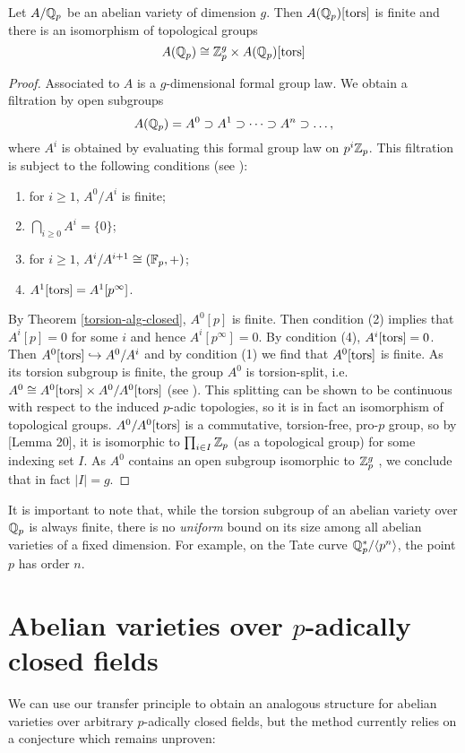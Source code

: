 \begin{theorem}
\label{structure-of-padic-AVs}
Let $A/\mathbb{Q}_p$ be an abelian variety of dimension $g$. Then $A(\mathbb{Q}_p)[\operatorname{tors}]$ is finite and there is an isomorphism of topological groups $$A(\mathbb{Q}_p)\cong \mathbb{Z}_p^g\times A(\mathbb{Q}_p)[\operatorname{tors}]$$
\end{theorem}
\begin{proof}
Associated to $A$ is a $g$-dimensional formal group law. We obtain a filtration by open subgroups $$A(\mathbb{Q}_p)=A^0\supset A^1\supset \dots\supset A^n\supset \dots, $$ where $A^i$ is obtained by evaluating this formal group law on $p^i\mathbb{Z}_p$. This filtration is subject to the following conditions (see \cite{serre2009lie}):
\begin{enumerate}
	\item for $i\geq 1$, $A^0/A^i$ is finite;
	\item $\bigcap_{i\geq 0} A^i = \{0\}$;
	\item for $i\geq 1$, $A^i/A^{i+1}\cong (\mathbb{F}_p, +)$;
	\item $A^1[\operatorname{tors}]=A^1[p^{\infty}]$.
\end{enumerate}
By Theorem \ref{torsion-alg-closed}, $A^0[p]$ is finite. Then condition (2) implies that $A^i[p]=0$ for some $i$ and hence $A^i[p^{\infty}]=0$. By condition (4), $A^i[\operatorname{tors}]=0$. Then $A^0[\operatorname{tors}]\hookrightarrow A^0/A^i$ and by condition (1) we find that $A^0[\operatorname{tors}]$ is finite. As its torsion subgroup is finite, the group $A^0$ is torsion-split, i.e. $A^0\cong A^0[\operatorname{tors}]\times A^0/A^0[\operatorname{tors}]$ (see \cite{baer}). This splitting can be shown to be continuous with respect to the induced $p$-adic topologies, so it is in fact an isomorphism of topological groups. $A^0/A^0[\operatorname{tors}]$ is a commutative, torsion-free, pro-$p$ group, so by \cite{clark2019there}[Lemma 20], it is isomorphic to $\prod_{i\in I} \mathbb{Z}_p$ (as a topological group) for some indexing set $I$. As $A^0$ contains an open subgroup isomorphic to $\mathbb{Z}_p^g$ \cite{serre2009lie}, we conclude that in fact $|I|=g$.
\end{proof}

It is important to note that, while the torsion subgroup of an abelian variety over $\mathbb{Q}_p$ is always finite, there is no \emph{uniform} bound on its size among all abelian varieties of a fixed dimension. For example, on the Tate curve $\mathbb{Q}_p^*/\langle p^n\rangle$, the point $p$ has order $n$.

\section{Abelian varieties over $p$-adically closed fields}
We can use our transfer principle to obtain an analogous structure for abelian varieties over arbitrary $p$-adically closed fields, but the method currently relies on a conjecture which remains unproven:

